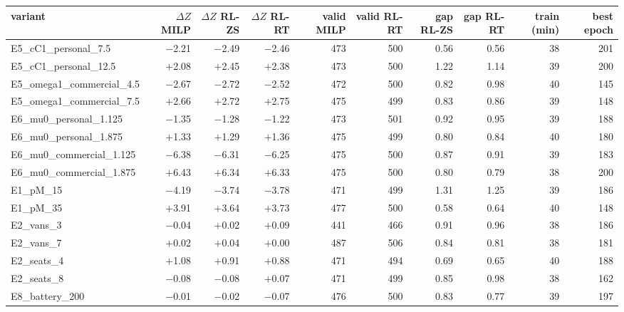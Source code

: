 \footnotesize
\begin{adjustbox}{max width=\linewidth}
\begin{tabular}{@{}lrrrrrrrrr@{}}
\toprule
variant & \shortstack{$\Delta Z$\\MILP} & \shortstack{$\Delta Z$\\RL-ZS} & \shortstack{$\Delta Z$\\RL-RT} & valid MILP & valid RL-RT & gap RL-ZS & gap RL-RT & train (min) & best epoch \\
\midrule
E5\_cC1\_personal\_7.5 & $-$2.21 & $-$2.49 & $-$2.46 & 473 & 500 & 0.56 & 0.56 & 38 & 201 \\
E5\_cC1\_personal\_12.5 & $+$2.08 & $+$2.45 & $+$2.38 & 473 & 500 & 1.22 & 1.14 & 39 & 200 \\
E5\_omega1\_commercial\_4.5 & $-$2.67 & $-$2.72 & $-$2.52 & 472 & 500 & 0.82 & 0.98 & 40 & 145 \\
E5\_omega1\_commercial\_7.5 & $+$2.66 & $+$2.72 & $+$2.75 & 475 & 499 & 0.83 & 0.86 & 39 & 148 \\
E6\_mu0\_personal\_1.125 & $-$1.35 & $-$1.28 & $-$1.22 & 473 & 501 & 0.92 & 0.95 & 39 & 188 \\
E6\_mu0\_personal\_1.875 & $+$1.33 & $+$1.29 & $+$1.36 & 475 & 499 & 0.80 & 0.84 & 40 & 180 \\
E6\_mu0\_commercial\_1.125 & $-$6.38 & $-$6.31 & $-$6.25 & 475 & 500 & 0.87 & 0.91 & 39 & 183 \\
E6\_mu0\_commercial\_1.875 & $+$6.43 & $+$6.34 & $+$6.33 & 475 & 500 & 0.80 & 0.79 & 38 & 200 \\
E1\_pM\_15 & $-$4.19 & $-$3.74 & $-$3.78 & 471 & 499 & 1.31 & 1.25 & 39 & 186 \\
E1\_pM\_35 & $+$3.91 & $+$3.64 & $+$3.73 & 477 & 500 & 0.58 & 0.64 & 40 & 148 \\
E2\_vans\_3 & $-$0.04 & $+$0.02 & $+$0.09 & 441 & 466 & 0.91 & 0.96 & 38 & 186 \\
E2\_vans\_7 & $+$0.02 & $+$0.04 & $+$0.00 & 487 & 506 & 0.84 & 0.81 & 38 & 181 \\
E2\_seats\_4 & $+$1.08 & $+$0.91 & $+$0.88 & 471 & 494 & 0.69 & 0.65 & 40 & 188 \\
E2\_seats\_8 & $-$0.08 & $-$0.08 & $+$0.07 & 471 & 499 & 0.85 & 0.98 & 38 & 162 \\
E8\_battery\_200 & $-$0.01 & $-$0.02 & $-$0.07 & 476 & 500 & 0.83 & 0.77 & 39 & 197 \\
\bottomrule
\end{tabular}
\end{adjustbox}

